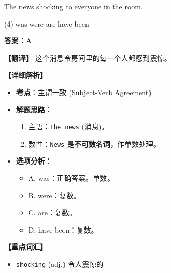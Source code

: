 \documentclass[11pt, a4paper]{article}
\newcommand{\analysis}[4]{
    \begin{solutionbox}
        \textbf{答案：#1}
        
        \textbf{【翻译】} #2
        
        \textbf{【详细解析】}
        #3
        
        \textbf{【重点词汇】}
        #4
    \end{solutionbox}
}
\newcommand{\blank}{\underline{\hspace{1.5cm}}}
\begin{document}
\begin{questions}
    \item The news \blank shocking to everyone in the room.
    \begin{tasks}(4)
        \task was \task were \task are \task have been
    \end{tasks}
    \analysis{A}{这个消息令房间里的每一个人都感到震惊。}{
        \begin{itemize}
            \item \textbf{考点}：主谓一致 (Subject-Verb Agreement)
            \item \textbf{解题思路}：
                \begin{enumerate}
                    \item 主语：\texttt{The news} (消息)。
                    \item 数性：\texttt{News} 是\textbf{不可数名词}，作单数处理。
                \end{enumerate}
            \item \textbf{选项分析}：
                \begin{itemize}
                    \item A. was：正确答案。单数。
                    \item B. were：复数。
                    \item C. are：复数。
                    \item D. have been：复数。
                \end{itemize}
        \end{itemize}
    }{
        \begin{itemize}
            \item \texttt{shocking} (adj.) 令人震惊的
        \end{itemize}
    }


\end{questions}
\end{document}
